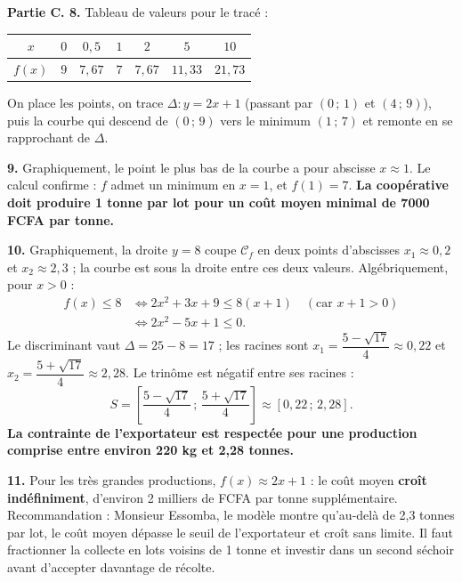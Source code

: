 \documentclass[11pt]{article}
\begin{document}
\begin{exoresolu}
\textbf{Partie C. 8.} Tableau de valeurs pour le tracé :
\begin{center}
\begin{tabular}{|c|cccccc|}\hline
$x$ & $0$ & $0{,}5$ & $1$ & $2$ & $5$ & $10$ \\ \hline
$f(x)$ & $9$ & $7{,}67$ & $7$ & $7{,}67$ & $11{,}33$ & $21{,}73$ \\ \hline
\end{tabular}
\end{center}
On place les points, on trace $\Delta : y = 2x+1$ (passant par $(0\,;\,1)$ et $(4\,;\,9)$), puis la courbe qui descend de $(0\,;\,9)$ vers le minimum $(1\,;\,7)$ et remonte en se rapprochant de $\Delta$.

\textbf{9.} Graphiquement, le point le plus bas de la courbe a pour abscisse $x \approx 1$. Le calcul confirme : $f$ admet un minimum en $x = 1$, et $f(1) = 7$. \textbf{La coopérative doit produire 1 tonne par lot pour un coût moyen minimal de \num{7000} FCFA par tonne.}

\textbf{10.} Graphiquement, la droite $y = 8$ coupe $\mathcal{C}_f$ en deux points d'abscisses $x_1 \approx 0{,}2$ et $x_2 \approx 2{,}3$ ; la courbe est sous la droite entre ces deux valeurs. Algébriquement, pour $x > 0$ :
\begin{align*}
f(x) \leq 8 &\iff 2x^2 + 3x + 9 \leq 8(x+1) \quad (\text{car } x+1 > 0) \\
&\iff 2x^2 - 5x + 1 \leq 0.
\end{align*}
Le discriminant vaut $\Delta = 25 - 8 = 17$ ; les racines sont $x_1 = \dfrac{5 - \sqrt{17}}{4} \approx 0{,}22$ et $x_2 = \dfrac{5 + \sqrt{17}}{4} \approx 2{,}28$. Le trinôme est négatif entre ses racines :
\[ S = \left[\frac{5-\sqrt{17}}{4}\,;\,\frac{5+\sqrt{17}}{4}\right] \approx [0{,}22\,;\,2{,}28]. \]
\textbf{La contrainte de l'exportateur est respectée pour une production comprise entre environ 220 kg et 2,28 tonnes.}

\textbf{11.} Pour les très grandes productions, $f(x) \approx 2x+1$ : le coût moyen \textbf{croît indéfiniment}, d'environ 2 milliers de FCFA par tonne supplémentaire. Recommandation : \og Monsieur Essomba, le modèle montre qu'au-delà de 2,3 tonnes par lot, le coût moyen dépasse le seuil de l'exportateur et croît sans limite. Il faut fractionner la collecte en lots voisins de 1 tonne et investir dans un second séchoir avant d'accepter davantage de récolte. \fg
\end{exoresolu}
\end{document}
